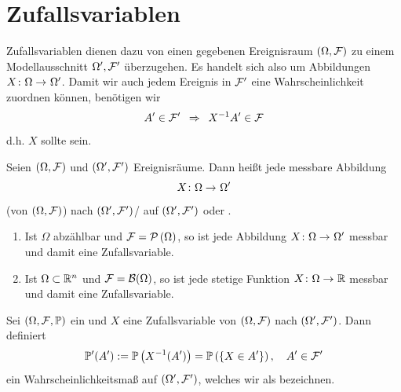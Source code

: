 \section{Zufallsvariablen}

Zufallsvariablen dienen dazu von einen gegebenen Ereignisraum $(\Omega, \mathcal{F})$ zu einem Modellausschnitt $\Omega', \mathcal{F}'$ überzugehen. 
Es handelt sich also um Abbildungen $\abb{X}{\Omega}{\Omega'}$.
Damit wir auch jedem Ereignis in $\mathcal{F}'$ eine Wahrscheinlichkeit zuordnen können, benötigen wir	
\begin{equation*}
    A' \in \mathcal{F}' \enskip \Rightarrow \enskip X^{-1} A' \in \mathcal{F}		
\end{equation*}
d.h. $X$ sollte  sein.

\begin{definition}[Zufallsvariable]
    Seien $(\Omega, \mathcal{F})$ und $(\Omega', \mathcal{F}')$ Ereignisräume. Dann heißt jede messbare Abbildung
    \begin{equation*}
        \abb{X}{\Omega}{\Omega'}
    \end{equation*}
     (von $(\Omega, \mathcal{F})$) nach $(\Omega', \mathcal{F}')$/ auf $(\Omega', \mathcal{F}')$ oder .
\end{definition}

\begin{beispiel}
    \begin{enumerate}[leftmargin=*]
        \item Ist $\Omega$ abzählbar und $\mathcal{F} = \mathcal{P}\left( \Omega \right)$, so ist jede Abbildung $\abb{X}{\Omega}{\Omega'}$ messbar und damit eine Zufallsvariable.
        \item Ist $\Omega \subset \mathbb{R}^n$ und $\mathcal{F} = \mathcal{B}(\Omega)$, so ist jede stetige Funktion $\abb{X}{\Omega}{\R}$ messbar und damit eine Zufallsvariable.
    \end{enumerate}
\end{beispiel}

\begin{satz}
    Sei $(\Omega, \mathcal{F}, \mathbb{P})$ ein \WRaum und $X$ eine Zufallsvariable von $(\Omega, \mathcal{F})$ nach $(\Omega', \mathcal{F}')$. Dann definiert
    \begin{equation*}
    \mathbb{P}'(A') \mathrel{:=} \mathbb{P}\left(X^{-1}(A')\right) = \mathbb{P}\left(\left\{ X \in A' \right\}\right), \quad A' \in \mathcal{F}'
    \end{equation*}
    ein Wahrscheinlichkeitsmaß auf $(\Omega', \mathcal{F}')$, welches wir als  bezeichnen.
\end{satz}

